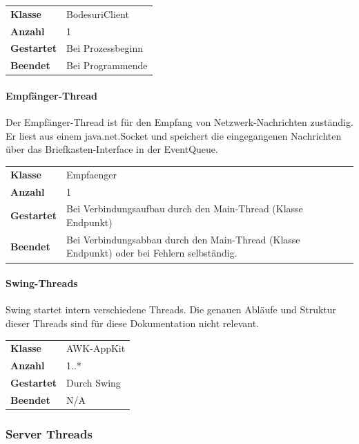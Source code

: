 \documentclass[12pt,halfparskip]{scrartcl}
\begin{document}
\begin{tabular}{@{} l p{12.5cm}}
\textbf{Klasse}       & BodesuriClient \\
\textbf{Anzahl}       & 1 \\
\textbf{Gestartet}    & Bei Prozessbeginn \\
\textbf{Beendet}      & Bei Programmende
\end{tabular}

\paragraph{Empfänger-Thread}

Der Empfänger-Thread ist für den Empfang von Netzwerk-Nachrichten zuständig. Er liest aus einem java.net.Socket und speichert die eingegangenen Nachrichten über das Briefkasten-Interface in der EventQueue.

\begin{tabular}{@{} l p{12.5cm}}
\textbf{Klasse}       & Empfaenger \\
\textbf{Anzahl}       & 1 \\
\textbf{Gestartet}    & Bei Verbindungsaufbau durch den Main-Thread (Klasse Endpunkt) \\
\textbf{Beendet}      & Bei Verbindungsabbau durch den Main-Thread (Klasse Endpunkt) oder bei Fehlern selbständig.
\end{tabular}


\paragraph{Swing-Threads}
\label{ssub:swing_threads}

Swing startet intern verschiedene Threads. Die genauen Abläufe und Struktur dieser Threads sind für diese Dokumentation nicht relevant.

\begin{tabular}{@{} l p{12.5cm}}
\textbf{Klasse}       & AWK-AppKit \\
\textbf{Anzahl}       & 1..* \\
\textbf{Gestartet}    & Durch Swing \\
\textbf{Beendet}      & N/A

\end{tabular}

\clearpage
\subsubsection{Server Threads}
\label{ssub:server}
\end{document}
